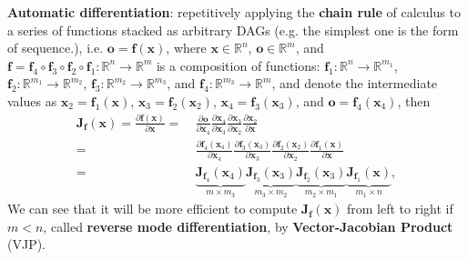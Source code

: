 \textbf{Automatic differentiation}: 
repetitively applying the \textbf{chain rule} of calculus 
to a series of functions stacked as arbitrary DAGs (e.g. the simplest one is the form of sequence.),
i.e. $\bm{o}=\bm{f}(\bm{x})$, where $\bm{x}\in\mathbb{R}^n$, $\bm{o}\in\mathbb{R}^m$, 
and $\bm{f}=\bm{f}_4\circ\bm{f}_3\circ\bm{f}_2\circ\bm{f}_1:\mathbb{R}^n\to\mathbb{R}^m$ is a composition of functions: 
$\bm{f}_1:\mathbb{R}^n\to\mathbb{R}^{m_1}$, $\bm{f}_2:\mathbb{R}^{m_1}\to\mathbb{R}^{m_2}$, 
$\bm{f}_3:\mathbb{R}^{m_2}\to\mathbb{R}^{m_3}$, and $\bm{f}_4:\mathbb{R}^{m_3}\to\mathbb{R}^{m}$,
and denote the intermediate values as $\bm{x}_2=\bm{f}_1(\bm{x})$, $\bm{x}_3=\bm{f}_2(\bm{x}_2)$,
$\bm{x}_4=\bm{f}_3(\bm{x}_3)$, and $\bm{o}=\bm{f}_4(\bm{x}_4)$, then
\begin{align}
    \mathbf{J}_{\bm{f}}(\bm{x})
    = \frac{\partial\bm{f}(\bm{x})}{\partial\bm{x}} 
    =&~ \frac{\partial\bm{o}}{\partial\bm{x}_4}
       \frac{\partial\bm{x}_4}{\partial\bm{x}_3}
       \frac{\partial\bm{x}_3}{\partial\bm{x}_2}
       \frac{\partial\bm{x}_2}{\partial\bm{x}} \\
    =&~ \frac{\partial\bm{f}_4(\bm{x}_4)}{\partial\bm{x}_4}
       \frac{\partial\bm{f}_3(\bm{x}_3)}{\partial\bm{x}_3}
       \frac{\partial\bm{f}_2(\bm{x}_2)}{\partial\bm{x}_2}
       \frac{\partial\bm{f}_1(\bm{x})}{\partial\bm{x}} \\
    =&~ \underbrace{\mathbf{J}_{\bm{f}_4}(\bm{x}_4)}_{m \times m_3}
        \underbrace{\mathbf{J}_{\bm{f}_3}(\bm{x}_3)}_{m_3 \times m_2}
        \underbrace{\mathbf{J}_{\bm{f}_2}(\bm{x}_3)}_{m_2 \times m_1}
        \underbrace{\mathbf{J}_{\bm{f}_1}(\bm{x})}_{m_1 \times n},
\end{align}
We can see that it will be more efficient to compute $\mathbf{J}_{\bm{f}}(\bm{x})$
from left to right if $m<n$, called \textbf{reverse mode differentiation}, 
by \textbf{Vector-Jacobian Product} (VJP).

